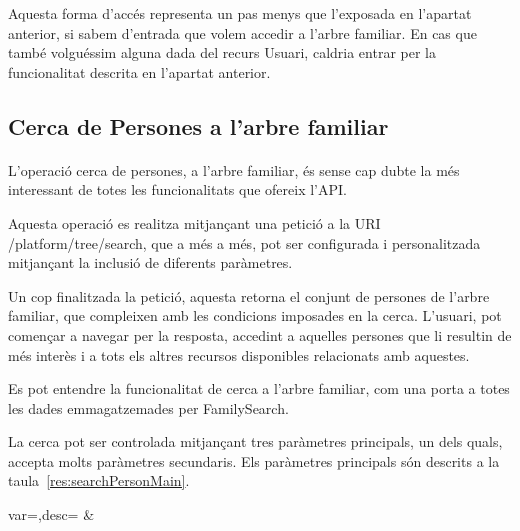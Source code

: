         Aquesta forma d'accés representa un pas menys que l’exposada en l’apartat anterior, si sabem d'entrada que volem accedir a l'arbre familiar. En cas que també volguéssim alguna dada del recurs Usuari, caldria entrar per la funcionalitat descrita en l'apartat anterior.


    \subsection{Cerca de Persones a l'arbre familiar}

        \paragraph{}
        L'operació cerca de persones, a l'arbre familiar, és sense cap dubte la més interessant de totes les funcionalitats que ofereix l'API.

        Aquesta operació es realitza mitjançant una petició a la URI /platform/tree/search, que a més a més, pot ser configurada i personalitzada mitjançant la inclusió de diferents paràmetres.

        Un cop finalitzada la petició, aquesta retorna el conjunt de persones de l'arbre familiar, que compleixen amb les condicions imposades en la cerca. L'usuari, pot començar a navegar per la resposta, accedint a aquelles persones que li resultin de més interès i a tots els altres recursos disponibles relacionats amb aquestes.

        Es pot entendre la funcionalitat de cerca a l'arbre familiar, com una porta a totes les dades emmagatzemades per FamilySearch.

        La cerca pot ser controlada mitjançant tres paràmetres principals, un dels quals, accepta molts paràmetres secundaris. Els paràmetres principals són descrits a la taula~\ref{res:searchPersonMain}.

        \begin{center}
                 {var=\var,desc=\desc}
                 {\var&\desc}
         \end{center}

